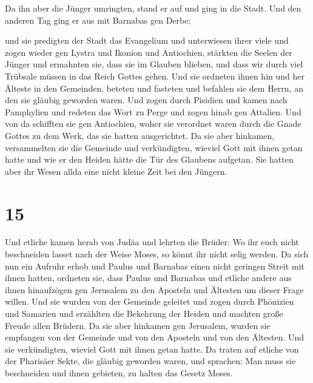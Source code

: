  Da ihn aber die Jünger umringten, stand er auf und ging
in die Stadt. Und den anderen Tag ging er aus mit Barnabas gen Derbe;

 und sie predigten der Stadt das Evangelium und
unterwiesen ihrer viele und zogen wieder gen Lystra und Ikonion und
Antiochien,  stärkten die Seelen der Jünger und ermahnten
sie, dass sie im Glauben blieben, und dass wir durch viel Trübsale
müssen in das Reich Gottes gehen.  Und sie ordneten ihnen
hin und her Älteste in den Gemeinden, beteten und fasteten und befahlen
sie dem Herrn, an den sie gläubig geworden waren.  Und
zogen durch Pisidien und kamen nach Pamphylien  und
redeten das Wort zu Perge und zogen hinab gen Attalien. 
Und von da schifften sie gen Antiochien, woher sie verordnet waren durch
die Gnade Gottes zu dem Werk, das sie hatten ausgerichtet.
 Da sie aber hinkamen, versammelten sie die Gemeinde und
verkündigten, wieviel Gott mit ihnen getan hatte und wie er den Heiden
hätte die Tür des Glaubens aufgetan.  Sie hatten aber ihr
Wesen allda eine nicht kleine Zeit bei den Jüngern.

\hypertarget{section-14}{%
\section{15}\label{section-14}}

 Und etliche kamen herab von Judäa und lehrten die Brüder:
Wo ihr euch nicht beschneiden lasset nach der Weise Moses, so könnt ihr
nicht selig werden.  Da sich nun ein Aufruhr erhob und
Paulus und Barnabas einen nicht geringen Streit mit ihnen hatten,
ordneten sie, dass Paulus und Barnabas und etliche andere aus ihnen
hinaufzögen gen Jerusalem zu den Aposteln und Ältesten um dieser Frage
willen.  Und sie wurden von der Gemeinde geleitet und
zogen durch Phönizien und Samarien und erzählten die Bekehrung der
Heiden und machten große Freude allen Brüdern.  Da sie
aber hinkamen gen Jerusalem, wurden sie empfangen von der Gemeinde und
von den Aposteln und von den Ältesten. Und sie verkündigten, wieviel
Gott mit ihnen getan hatte.  Da traten auf etliche von der
Pharisäer Sekte, die gläubig geworden waren, und sprachen: Man muss sie
beschneiden und ihnen gebieten, zu halten das Gesetz Moses.

